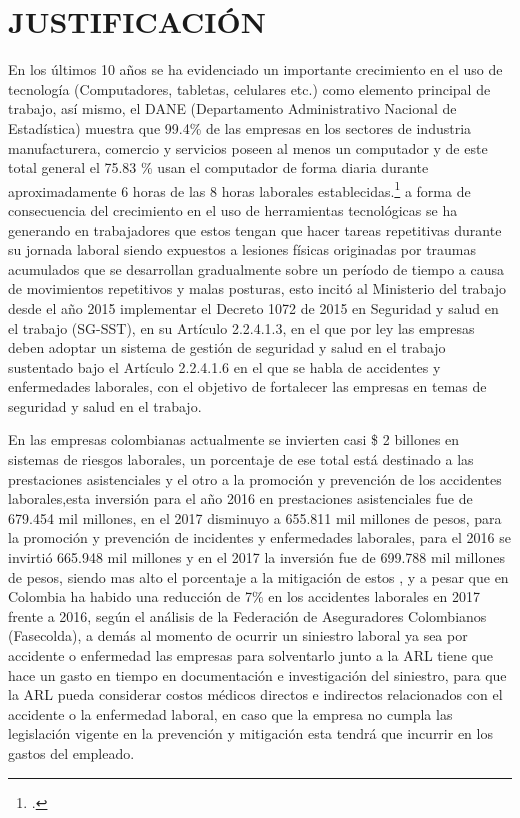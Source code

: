 \chapter{JUSTIFICACIÓN}
En los últimos 10 años se ha evidenciado un importante crecimiento en el uso de tecnología (Computadores, tabletas, celulares etc.) como elemento principal de trabajo, así mismo, el DANE (Departamento Administrativo Nacional de Estadística)  muestra que 99.4\% de las empresas en los sectores de industria manufacturera, comercio y servicios poseen al menos un computador y de este total general el 75.83 \% usan el computador de forma diaria durante aproximadamente 6 horas de las 8 horas laborales establecidas.\footcite[]{Dane2013IndicadoresEmpresas} a forma de consecuencia del crecimiento en el uso de herramientas tecnológicas se ha generando en trabajadores que estos tengan que hacer tareas repetitivas durante su jornada laboral siendo expuestos a lesiones físicas originadas por traumas acumulados que se desarrollan gradualmente sobre un período de tiempo a causa de movimientos repetitivos y malas posturas, esto incitó al Ministerio del trabajo desde el año 2015 implementar el Decreto 1072 de 2015 en Seguridad y salud en el trabajo (SG-SST), en su Artículo 2.2.4.1.3, en el que por ley las empresas deben adoptar un sistema de gestión de seguridad y salud en el trabajo sustentado bajo el Artículo 2.2.4.1.6 en el que se habla de accidentes y enfermedades laborales, con el objetivo de fortalecer las empresas en temas de seguridad y salud en el trabajo.  

En las empresas colombianas actualmente se invierten casi \$ 2 billones en sistemas de riesgos laborales, un porcentaje de ese total está destinado a las prestaciones asistenciales y el otro a la promoción y prevención de los accidentes laborales,esta inversión para el año 2016 en prestaciones asistenciales fue de 679.454 mil millones, en el 2017 disminuyo  a 655.811 mil millones de pesos, para la promoción y prevención de incidentes y enfermedades laborales, para el 2016 se invirtió 665.948 mil millones y en el 2017 la inversión fue de 699.788 mil millones de pesos, siendo mas alto el porcentaje a la mitigación de estos , y a pesar que en Colombia ha habido una reducción de 7\% en los accidentes laborales en 2017 frente a 2016, según el análisis de la Federación de Aseguradores Colombianos (Fasecolda), a demás al momento de ocurrir un siniestro laboral ya sea por accidente o enfermedad las empresas para solventarlo junto a la ARL tiene que hace un gasto en tiempo en documentación e investigación del siniestro, para que la ARL pueda considerar costos médicos directos e  indirectos relacionados con el accidente o la enfermedad laboral, en caso que la empresa no cumpla las legislación vigente en la prevención y mitigación esta tendrá que incurrir en los gastos del empleado. 

